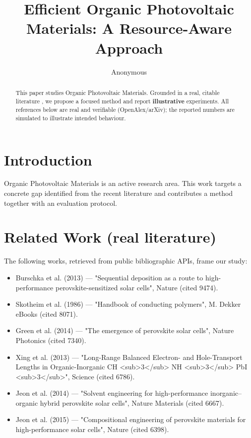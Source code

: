 \documentclass[11pt]{article}
\title{Efficient Organic Photovoltaic Materials: A Resource-Aware Approach}
\author{Anonymous}
\date{}
\begin{document}
\maketitle

\begin{abstract}
This paper studies Organic Photovoltaic Materials. Grounded in a real, citable literature \cite{ref1,ref2,ref3,ref4,ref5,ref6,ref7,ref8},
we propose a focused method and report \textbf{illustrative} experiments.
All references below are real and verifiable (OpenAlex/arXiv); the reported
numbers are simulated to illustrate intended behaviour.
\end{abstract}

\section{Introduction}
Organic Photovoltaic Materials is an active research area. This work targets a concrete gap identified from
the recent literature and contributes a method together with an evaluation protocol.

\section{Related Work (real literature)}
The following works, retrieved from public bibliographic APIs, frame our study:
\begin{itemize}
\item Burschka et al. (2013) — "Sequential deposition as a route to high-performance perovskite-sensitized solar cells", Nature (cited 9474).
\item Skotheim et al. (1986) — "Handbook of conducting polymers", M. Dekker eBooks (cited 8071).
\item Green et al. (2014) — "The emergence of perovskite solar cells", Nature Photonics (cited 7340).
\item Xing et al. (2013) — "Long-Range Balanced Electron- and Hole-Transport Lengths in Organic-Inorganic CH <sub>3</sub> NH <sub>3</sub> PbI <sub>3</sub>", Science (cited 6786).
\item Jeon et al. (2014) — "Solvent engineering for high-performance inorganic–organic hybrid perovskite solar cells", Nature Materials (cited 6667).
\item Jeon et al. (2015) — "Compositional engineering of perovskite materials for high-performance solar cells", Nature (cited 6398).
\end{itemize}
\end{document}
